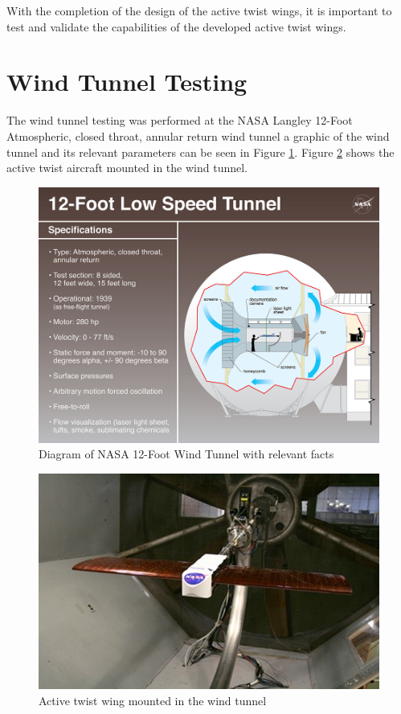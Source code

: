 \documentclass[11pt]{ucthesis}
\begin{document}
With the completion of the design of the active twist wings, it is important to test and validate the capabilities of the developed active twist wings.

\section{Wind Tunnel Testing}
The wind tunnel testing was performed at the NASA Langley 12-Foot Atmospheric, closed throat, annular return wind tunnel a graphic of the wind tunnel and its relevant parameters can be seen in Figure \ref{fig:windTunnel}. Figure \ref{fig:flex} shows the active twist aircraft mounted in the wind tunnel.

\begin{figure}[thpb]
\centering
\includegraphics[width=1\linewidth]{Figures/12FootWindTunnel.png}
\caption{Diagram of NASA 12-Foot Wind Tunnel with relevant facts}
\label{fig:windTunnel}
\end{figure}

\begin{figure}[thpb]
\centering
\includegraphics[width=0.75\linewidth]{Figures/wingFlex.png}
\caption{Active twist wing mounted in the wind tunnel}
\label{fig:flex}
\end{figure}
\end{document}
